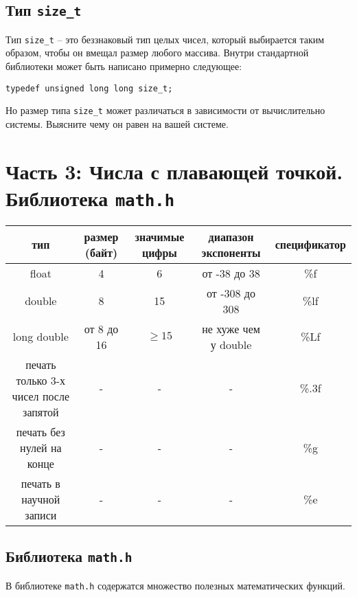 \documentclass{article}
\begin{document}
\subsection*{Тип \texttt{size\_t}} 
Тип \texttt{size\_t} -- это беззнаковый тип целых чисел, который выбирается таким образом, чтобы он вмещал размер любого массива. Внутри стандартной библиотеки может быть написано примерно следующее:
\begin{lstlisting}
typedef unsigned long long size_t;
\end{lstlisting}
Но размер типа \texttt{size\_t} может различаться в зависимости от вычислительно системы. Выясните чему он равен на вашей системе.

\newpage
\section*{Часть 3: Числа с плавающей точкой. Библиотека \texttt{math.h}}
\begin{center}
\begin{tabular}{ c c c c c }
 тип & размер (байт) & значимые цифры & диапазон экспоненты & спецификатор \\ \hline
 float             & 4          & 6  & от -38 до 38    & \%f \\ 
 double            & 8          & 15 & от -308 до 308  & \%lf  \\  
 long double       & от 8 до 16 & $\ge 15$  & не хуже чем у double  & \%Lf  \\ \hline
 печать только 3-х чисел после запятой & -          & -  & -              & \%.3f \\
 печать без нулей на конце & -          & -  & -              & \%g \\
 печать в научной записи   & -          & -  & -              & \%e \\
\end{tabular}
\end{center}


\subsection*{Библиотека \texttt{math.h}}
В библиотеке \texttt{math.h} содержатся множество полезных математических функций.
\end{document}
